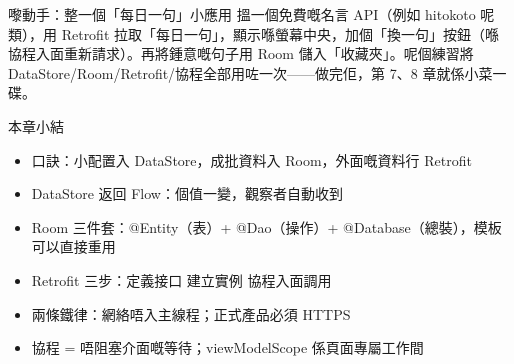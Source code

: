 \begin{tcbpractice}{嚟動手：整一個「每日一句」小應用}
搵一個免費嘅名言 API（例如 hitokoto 呢類），用 Retrofit 拉取「每日一句」，顯示喺螢幕中央，加個「換一句」按鈕（喺協程入面重新請求）。再將鍾意嘅句子用 Room 儲入「收藏夾」。呢個練習將 DataStore/Room/Retrofit/協程全部用咗一次——做完佢，第 7、8 章就係小菜一碟。

\end{tcbpractice}

\begin{tcbsummary}{本章小結}
\begin{itemize}
  \item 口訣：小配置入 DataStore，成批資料入 Room，外面嘅資料行 Retrofit
  \item DataStore 返回 Flow：個值一變，觀察者自動收到
  \item Room 三件套：@Entity（表）+ @Dao（操作）+ @Database（總裝），模板可以直接重用
  \item Retrofit 三步：定義接口 建立實例 協程入面調用
  \item 兩條鐵律：網絡唔入主線程；正式產品必須 HTTPS
  \item 協程 = 唔阻塞介面嘅等待；viewModelScope 係頁面專屬工作間
\end{itemize}

\end{tcbsummary}
